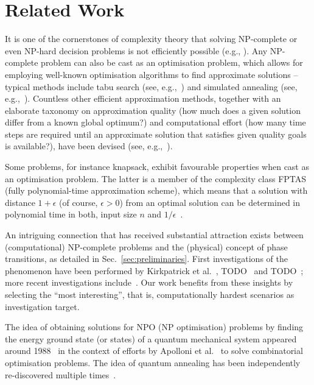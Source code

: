 \section{Related Work}
\label{sec:related-work}

It is one of the cornerstones of complexity theory that solving NP-complete or even NP-hard decision problems is not efficiently possible (e.g., \cite{cook1971complexity,murty1987some}). Any NP-complete problem can also be cast as an optimisation problem, which allows for employing well-known optimisation algorithms to find approximate solutions -- typical methods include tabu search (see, e.g.,~\cite{glover2013tabu,gendreau1994tabu}) and simulated annealing (see, e.g.,~\cite{kirkpatrick1983optimization,chen1995chaotic}). Countless other efficient approximation methods, together with an elaborate taxonomy on approximation quality (how much does a given solution differ from a known global optimum?) and computational effort (how many time steps are required until an approximate solution that satisfies given quality goals is available?), have been devised (see, e.g.,~\cite{NPO-Compendium}).

Some problems, for instance knapsack, exhibit favourable properties when cast as an optimisation problem. The latter is a member of the complexity class FPTAS (fully polynomial-time approximation scheme), which means that a solution with distance \(1+\epsilon\) (of course, $\epsilon > 0$) from an optimal solution can be determined in polynomial time in both, input size \(n\) and \(1/\epsilon\)~\cite{chen1995chaotic}.

An intriguing connection that has received substantial attraction exists between (computational) NP-complete problems and the (physical) concept of phase transitions, as detailed in Sec.~\ref{sec:preliminaries}. First investigations of the phenomenon have been performed by Kirkpatrick et al.~\cite{kirkpatrick1994critical}, TODO~\cite{TODO monasson1999determining} and TODO~\cite{TODO}; more recent investigations include~\cite{TODO, TODO, TODO}. Our work benefits from these insights by selecting the ``most interesting'', that is, computationally hardest scenarios as investigation target.

The idea of obtaining solutions for NPO (NP optimisation) problems by finding the energy ground state (or states) of a quantum mechanical system appeared around 1988~\cite{TODO: Originalpaper,albash2016adiabatic} in the context of efforts by Apolloni et al.~\cite{apolloni1989quantum,apolloni1988numerical} to solve combinatorial optimisation problems.  The idea of quantum annealing has been independently re-discovered multiple times~\cite{albash2016adiabatic,finnila1994quantum,amara1993global,kadowaki1998quantum}.

